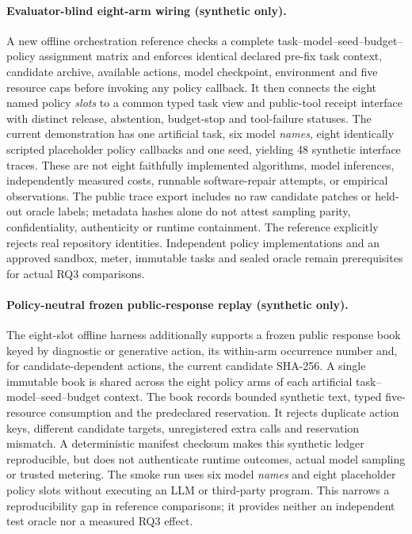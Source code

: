 \documentclass[pdflatex,sn-basic]{sn-jnl}
\begin{document}
\paragraph{Evaluator-blind eight-arm wiring (synthetic only).}
A new offline orchestration reference checks a complete
task--model--seed--budget--policy assignment matrix and
enforces identical declared pre-fix task context,
candidate archive, available actions, model checkpoint,
environment and five resource caps before invoking any
policy callback. It then connects the eight named
policy \emph{slots} to a common typed task view and
public-tool receipt interface with distinct release,
abstention, budget-stop and tool-failure statuses.
The current demonstration has one artificial task,
six model \emph{names}, eight identically scripted
placeholder policy callbacks and one seed, yielding
48 synthetic interface traces. These are not
eight faithfully implemented algorithms, model
inferences, independently measured costs, runnable
software-repair attempts, or empirical observations.
The public trace export includes no raw candidate
patches or held-out oracle labels; metadata hashes
alone do not attest sampling parity, confidentiality,
authenticity or runtime containment. The reference
explicitly rejects real repository identities.
Independent policy implementations and an approved
sandbox, meter, immutable tasks and sealed oracle
remain prerequisites for actual RQ3 comparisons.

\paragraph{Policy-neutral frozen public-response replay (synthetic only).}
The eight-slot offline harness additionally supports a frozen
public response book keyed by diagnostic or generative action,
its within-arm occurrence number and, for candidate-dependent
actions, the current candidate SHA-256. A single immutable book
is shared across the eight policy arms of each artificial
task--model--seed--budget context. The book records bounded
synthetic text, typed five-resource consumption and the
predeclared reservation. It rejects duplicate action keys,
different candidate targets, unregistered extra calls and
reservation mismatch. A deterministic manifest checksum
makes this synthetic ledger reproducible, but does not
authenticate runtime outcomes, actual model sampling or
trusted metering. The smoke run uses six model \emph{names}
and eight placeholder policy slots without executing an
LLM or third-party program. This narrows a reproducibility
gap in reference comparisons; it provides neither an
independent test oracle nor a measured RQ3 effect.
\end{document}
